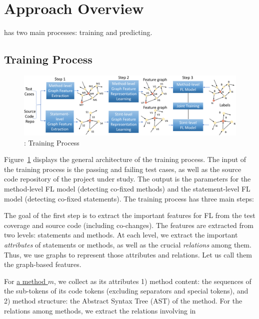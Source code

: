 \section{Approach Overview}
\label{overview:sec}

{\tool} has two main processes: training and predicting.

\subsection{Training Process}

\begin{figure}[t]
	\centering
	\includegraphics[width=5.6in]{graphs/overview-training.png}
	\caption{{\tool}: Training Process}
	\label{train-overview}
\end{figure}

Figure~\ref{train-overview} displays
the general architecture of the training process. The input of the
training process is the passing and failing test cases, as well as the
source code repository of the project under study. The output is the
parameters for the method-level FL model (detecting co-fixed
methods) and the statement-level FL model (detecting co-fixed
statements). The training process has three main steps:

\vspace{3pt}
The goal of the first step is to extract the important features for FL
from the test coverage and source code (including co-changes). The
features are extracted from two levels: statements and methods. At
each level, we extract the important {\em attributes} of statements or
methods, as well as the crucial {\em relations} among them. Thus, we
use graphs to represent those attributes and relations. Let us call
them the graph-based features.

For \underline{a method $m$}, we collect as its attributes 1) method
content: the sequences of the sub-tokens of its code tokens (excluding
separators and special tokens), and 2) method structure: the Abstract
Syntax Tree (AST) of the method. For the relations among methods, we
extract the relations involving in

